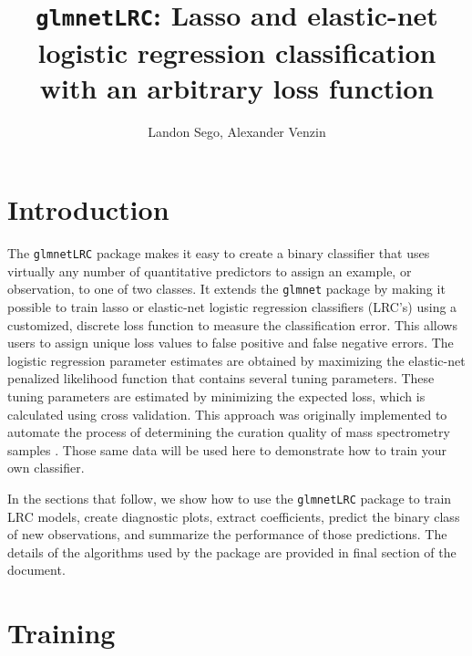 \documentclass{article}
\begin{document}
 


\title{{\tt glmnetLRC}: Lasso and elastic-net logistic regression classification with an arbitrary loss function\\}
\author{Landon Sego, Alexander Venzin}
\maketitle

\section{Introduction}

The {\tt glmnetLRC} package makes it easy to create a binary classifier that uses virtually any number of quantitative predictors to
assign an example, or observation, to one of two classes.
It extends the {\tt glmnet} package by making it possible to train lasso or elastic-net logistic 
regression classifiers (LRC's) using a customized, discrete loss function to measure the classification error.  
This allows users to assign unique 
loss values to false positive and false negative errors. The logistic regression parameter
estimates are obtained by maximizing the elastic-net penalized likelihood function that contains several tuning parameters. These
tuning parameters are estimated by minimizing the expected loss, which is calculated using cross validation.
This approach was originally implemented to automate the
process of determining the curation quality of mass spectrometry samples \cite{Amidan}. Those same data
will be used here to demonstrate how to train your own classifier.

In the sections that follow, we show how to use the {\tt glmnetLRC} package to train LRC models, create diagnostic plots,
extract coefficients, predict the binary class of new observations, and summarize the performance of those
predictions. The details of the algorithms used by the package are provided in final section of the document.

\section{Training}
\end{document}

